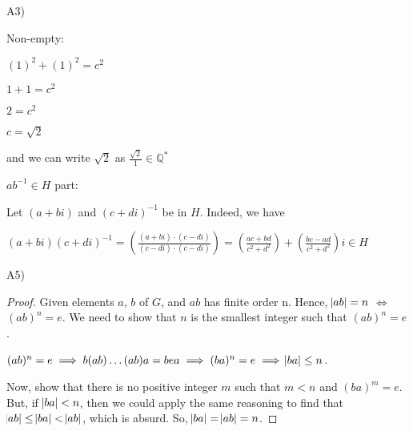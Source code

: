 \documentclass[executivepaper]{article}
\begin{document}
\begin{flushleft}

A3)

Non-empty:

\begin{center}

$(1)^{2} + (1)^{2}=c^{2}$

\vspace{2mm}

$1 + 1=c^{2}$

\vspace{2mm}

$2=c^{2}$

\vspace{2mm}

$c=\sqrt{2}$

\vspace{2mm}

and we can write $\sqrt{2}$ as $\frac{\sqrt{2}}{1} \in \mathbb{Q}^{*}$

\end{center}

$ab^{-1} \in H$ part:

\begin{center}

Let $(a+bi)$ and $(c+di)^{-1}$ be in $H$. Indeed, we have

\begin{center}

$(a+bi)(c+di)^{-1}=\left(\frac{(a+bi) \cdot (c-di)}{(c-di) \cdot (c-di)}\right)=\left(\frac{ac+bd}{c^2+d^2}\right) + \left(\frac{bc-ad}{c^2+d^2}\right)i \in H$

\end{center}

\end{center}

\end{flushleft}

\pagebreak

\begin{flushleft}

A5)

\begin{proof}

Given elements $a$, $b$ of $G$, and $ab$ has finite order n. Hence, $\abs{ab}=n$ $\iff$ $(ab)^{n}=e$. We need to show that $n$ is the smallest integer such that $(ab)^{n}=e$.

\begin{center}

$(ab)^{n}=e \implies b(ab) \ldots (ab)a=bea \implies (ba)^{n}=e \implies \abs{ba} \leq n$.

\end{center}

Now, show that there is no positive integer $m$ such that $m < n$ and $(ba)^{m}=e$. But, if $\abs{ba} < n$, then we could apply the same reasoning to find that $\abs{ab} \leq \abs{ba} < \abs{ab}$, which is absurd. So, $\abs{ba}=\abs{ab}=n$.

\end{proof}

\end{flushleft}
\end{document}
